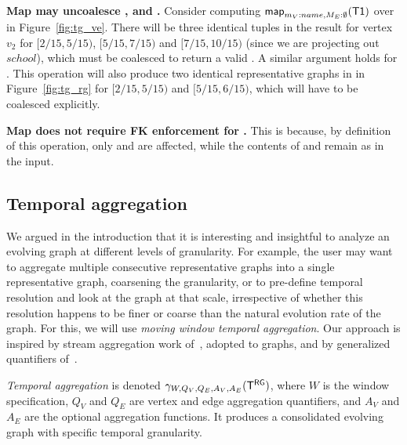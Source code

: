 {\bf Map may uncoalesce \tav, \tae and \trg.}  Consider computing
$\textsf{map}_{m_V:name, M_E:\emptyset} (\textsf{T1})$ over  in
Figure~\ref{fig:tg_ve}.  There will be three identical tuples in the
result for vertex $v_2$ for $[2/15, 5/15)$, $[5/15, 7/15)$ and $[7/15,
      10/15)$ (since we are projecting out $school$), which must be
      coalesced to return a valid \tav.  A similar argument holds for
      \tae. This operation will also produce two identical
      representative graphs in \trg in Figure~\ref{fig:tg_rg} for
      $[2/15, 5/15)$ and $[5/15, 6/15)$, which will have to be
          coalesced explicitly.

{\bf Map does not require FK enforcement for \tve.}  This is because,
by definition of this operation, only \tav and \tae are affected,
while the contents of \tv and \te remain as in the input.

\subsection{Temporal aggregation}
\label{sec:algebra:agg}

We argued in the introduction that it is interesting and insightful to
analyze an evolving graph at different levels of granularity.  For
example, the user may want to aggregate multiple consecutive
representative graphs into a single representative graph, coarsening
the granularity, or to pre-define temporal resolution and look at the
graph at that scale, irrespective of whether this resolution happens
to be finer or coarse than the natural evolution rate of the graph.
For this, we will use {\em moving window temporal aggregation}.  Our
approach is inspired by stream aggregation work of~\cite{Li2005},
adopted to graphs, and by generalized quantifiers of~\cite{Hsu1995}.

 {\em Temporal aggregation} is denoted $\gamma_{W,Q_V,Q_E,A_V,A_E}
 (\mathsf{T^{RG}})$, where $W$ is the window specification, $Q_V$ and $Q_E$ are
 vertex and edge aggregation quantifiers, and $A_V$ and $A_E$ are the
 optional aggregation functions.  It produces a consolidated evolving
 graph with specific temporal granularity.

